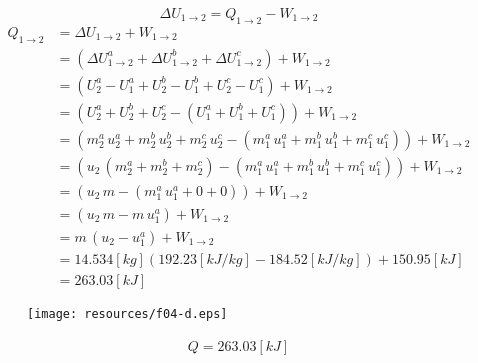 \documentclass[letter,11pt]{article}
\begin{document}
\begin{enumerate}
\begin{equation*}
    \Delta U_{1\rightarrow 2} = Q_{1\rightarrow 2} - W_{1\rightarrow 2}
\end{equation*}
\begin{equation*}
    \begin{split}
        Q_{1\rightarrow 2} &= \Delta U_{1\rightarrow 2} + W_{1\rightarrow 2} \\
                           &= (\Delta U^a_{1\rightarrow 2} 
                              + \Delta U^b_{1\rightarrow 2} 
                              + \Delta U^c_{1\rightarrow 2})
                              + W_{1\rightarrow 2} \\
                           &= (U_2^a - U_1^a + U_2^b - U_1^b + U_2^c - U_1^c)
                              + W_{1\rightarrow 2} \\
                           &= (U_2^a+U_2^b+U_2^c - (U_1^a+U_1^b+U_1^c))
                              + W_{1\rightarrow 2} \\
                           &= (m_2^a\,u_2^a+m_2^b\,u_2^b+m_2^c\,u_2^c
                              - (m_1^a\,u_1^a+m_1^b\,u_1^b+m_1^c\,u_1^c))
                              + W_{1\rightarrow 2} \\
                           &= (u_2\,(m_2^a+m_2^b+m_2^c)
                              - (m_1^a\,u_1^a+m_1^b\,u_1^b+m_1^c\,u_1^c))
                              + W_{1\rightarrow 2} \\
                           &= (u_2\,m-(m_1^a\,u_1^a+0+0))
                              + W_{1\rightarrow 2} \\
                           &= (u_2\,m-m\,u_1^a)+W_{1\rightarrow 2} \\
                           &= m\,(u_2-u_1^a)+W_{1\rightarrow 2} \\
                           &= 14.534[kg](192.23[kJ/kg]
                              -184.52[kJ/kg])+150.95[kJ] \\
                           &= 263.03[kJ]
    \end{split}
\end{equation*}

\begin{figure}[H]
\centering
\texttt{[image: resources/f04-d.eps]}
\end{figure}

\begin{equation*}
\boxed{
    \begin{array}{l}
        Q = 263.03[kJ]
    \end{array}
}
\end{equation*}
\newpage


\end{enumerate}
\end{document}
